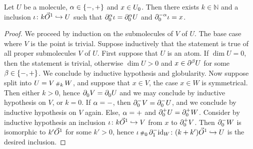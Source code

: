 \begin{lem} \label{lem:path_from_zero_bd_to_all_points}
    Let \( U \) be a molecule, \( \a \in \set{-, +} \) and \( x \in \gr{0}{U} \).
    Then there exists \( k \in \mathbb{N} \) and a inclusion \( \iota \colon k\dglobe{1} \incl U \) such that \( \bd{0}{\a} \iota = \bd{0}{\a} U \) and \( \bd{0}{-\a} \iota = x \).
\end{lem}
\begin{proof}
    We proceed by induction on the submolecules of \( V \) of \( U \).
    The base case where \( V \) is the point is trivial.
    Suppose inductively that the statement is true of all proper submolecules \( V \) of \( U \).
    First suppose that \( U \) is an atom.
    If \( \dim U = 0 \), then the statement is trivial, otherwise \( \dim U > 0 \) and \( x \in \bd{}{\beta} U \) for some \( \beta \in \set{-, +} \).
    We conclude by inductive hypothesis and globularity.
    Now suppose split into \( U = V \cp{k} W \), and suppose that \( x \in V \), the case \( x \in W \) is symmetrical.
    Then either \( k > 0 \), hence \( \bd{0}{} V = \bd{0}{} U \) and we may conclude by inductive hypothesis on \( V \), or \( k = 0 \).
    If \( \a = - \), then \( \bd{0}{-} V = \bd{0}{-} U \), and we conclude by inductive hypothesis on \( V \) again.
    Else, \( \a = + \) and \( \bd{0}{+} U = \bd{0}{+} W \).
    Consider by inductive hypothesis an inclusion \( \iota \colon k\dglobe{1} \incl V \) from \( x \) to \( \bd{0}{+} V \).
    Then \( \bd{0}{-} W \) is isomorphic to \( k'\dglobe{1} \) for some \( k' > 0 \), hence \( \iota \cp{0} \bd{1}{-} \idd{W} \colon (k + k') \dglobe{1} \incl U \) is the desired inclusion.
\end{proof}


